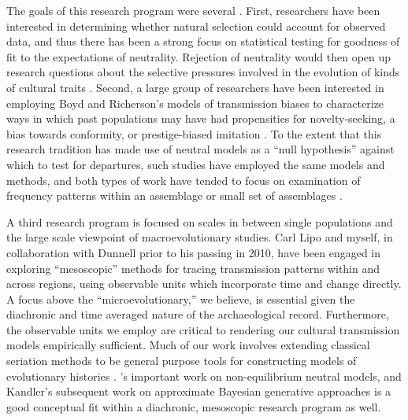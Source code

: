 The goals of this research program were several \citep{marwick2005can}.  First, researchers have been interested in determining whether natural selection could account for observed data, and thus there has been a strong focus on statistical testing for goodness of fit to the expectations of neutrality.  Rejection of neutrality would then open up research questions about the selective pressures involved in the evolution of kinds of cultural traits \citep{bettinger1999point,Bettinger2008,Eerkens2005,Evans2011,Pfeffer2001,steele2010ceramic,Wilhelmsen2001}.   Second, a large group of researchers have been interested in employing Boyd and Richerson's \citeyearpar{BR1985} models of transmission biases to characterize ways in which past populations may have had propensities for novelty-seeking, a bias towards conformity, or prestige-biased imitation \citep{acerbi2014biases,Bentley2001,8913,Bentley2003,8914,bentley2004random,Bentley2007b,bettinger1999point,Herzog2004,Kohler2004,mesoudi2009random,Shennan2001ceramic,shennan2008style}.  To the extent that this research tradition has made use of neutral models as a ``null hypothesis'' against which to test for departures, such studies have employed the same models and methods, and both types of work have tended to focus on examination of frequency patterns within an assemblage or small set of assemblages \citep[see the detailed reviews by][]{kandler2019analysing,walsh2019introduction}.

A third research program is focused on scales in between single populations and the large scale viewpoint of macroevolutionary studies.  Carl Lipo and myself, in collaboration with Dunnell prior to his passing in 2010, have been engaged in exploring ``mesoscopic'' methods for tracing transmission patterns within and across regions, using observable units which incorporate time and change directly.  A focus above the ``microevolutionary,'' we believe, is essential given the diachronic and time averaged nature of the archaeological record.  Furthermore, the observable units we employ are critical to rendering our cultural transmission models empirically sufficient. Much of our work involves extending classical seriation methods to be general purpose tools for constructing models of evolutionary histories \citep{Lipo1997,Lipo2001,Lipo2001neutrality,Lipo2005,Lipo2015,lipomadsen1997,lipomadsenhunt1995b,Madsen2008,Madsen2014,madsenlipo2015b}.  \citet*{Kandler2013}'s important work on non-equilibrium neutral models, and Kandler's subsequent work on approximate Bayesian generative approaches \citep{Kandler20150905,kandler2018generative,wilderkandler2015} is a good conceptual fit within a diachronic, mesoscopic research program as well.  

